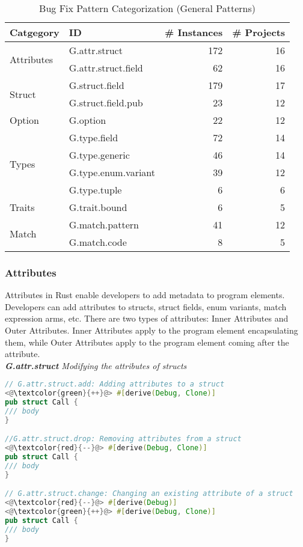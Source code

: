 \begin{table}[]

\begin{tabular}{l|l|r|r}
\textbf{Catgegory} & \textbf{ID} & \textbf{\# Instances} & \textbf{\# Projects} \\
\hline
\multirow{2}{*}{Attributes} & G.attr.struct & 172 & 16                                  \\
& G.attr.struct.field & 62 & 16                     \\\cline{1-4}
\multirow{2}{*}{Struct} & G.struct.field  & 179 & 17\\
& G.struct.field.pub & 23 & 12   
\\\cline{1-4}
Option & G.option & 22 & 12                    \\\cline{1-4}
\multirow{4}{*}{Types} & G.type.field  & 72 & 14 \\
& G.type.generic & 46 & 14\\ & G.type.enum.variant  & 39 & 12 \\
& G.type.tuple & 6 & 6                                         \\\cline{1-4}
\multirow{1}{*}{Traits} & G.trait.bound & 6 & 5 \\\cline{1-4}
\multirow{2}{*}{Match} & G.match.pattern & 41 & 12 \\
& G.match.code & 8 & 5 \\
\end{tabular}
\caption{\label{table:general}Bug Fix Pattern Categorization (General Patterns)}
\end{table}
    

\subsubsection{Attributes}

Attributes in Rust enable developers to add metadata to program elements. Developers can add attributes to structs, struct fields, enum variants, match expression arms, etc. There are two types of attributes: Inner Attributes and Outer Attributes. Inner Attributes apply to the program element encapsulating them, while Outer Attributes apply to the program element coming after the attribute. \\

\noindent\textit{\label{sec:G.attr.struct}\textbf{G.attr.struct} Modifying the attributes of structs}

\begin{lstlisting}[language=Rust, style=colouredRust]
// G.attr.struct.add: Adding attributes to a struct
<@\textcolor{green}{++}@> #[derive(Debug, Clone)]
pub struct Call {
/// body 
}

//G.attr.struct.drop: Removing attributes from a struct
<@\textcolor{red}{--}@> #[derive(Debug, Clone)]
pub struct Call {
/// body 
}

// G.attr.struct.change: Changing an existing attribute of a struct
<@\textcolor{red}{--}@> #[derive(Debug)]
<@\textcolor{green}{++}@> #[derive(Debug, Clone)]
pub struct Call {
/// body 
}
\end{lstlisting}

